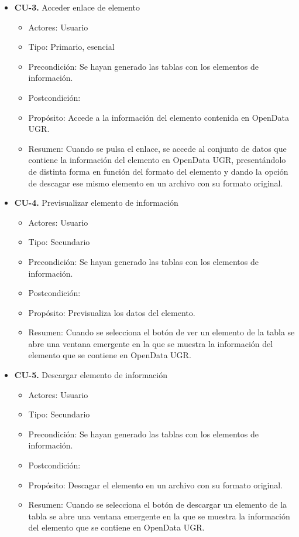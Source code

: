 \begin{itemize}
 \item \textbf{CU-3.} Acceder enlace de elemento
 \begin{itemize}
  \item Actores: Usuario
  \item Tipo: Primario, esencial
  \item Precondición: Se hayan generado las tablas con los elementos de información.
  \item Postcondición: 
  \item Propósito: Accede a la información del elemento contenida en OpenData UGR.
  \item Resumen: Cuando se pulsa el enlace, se accede al conjunto de datos que contiene la información del elemento en OpenData
  UGR, presentándolo de distinta forma en función del formato del elemento y dando la opción de descagar ese mismo elemento en 
  un archivo con su formato original.
 \end{itemize}
\end{itemize}

\begin{itemize}
 \item \textbf{CU-4.} Previsualizar elemento de información
 \begin{itemize}
  \item Actores: Usuario
  \item Tipo: Secundario
  \item Precondición: Se hayan generado las tablas con los elementos de información.
  \item Postcondición: 
  \item Propósito: Previsualiza los datos del elemento.
  \item Resumen: Cuando se selecciona el botón de ver un elemento de la tabla se abre una ventana emergente en la que se 
  muestra la información del elemento que se contiene en OpenData UGR.
 \end{itemize}
\end{itemize}

\newpage
\begin{itemize}
 \item \textbf{CU-5.} Descargar elemento de información
 \begin{itemize}
  \item Actores: Usuario
  \item Tipo: Secundario
  \item Precondición: Se hayan generado las tablas con los elementos de información.
  \item Postcondición: 
  \item Propósito: Descagar el elemento en un archivo con su formato original.
  \item Resumen: Cuando se selecciona el botón de descargar un elemento de la tabla se abre una ventana emergente en la que se
  muestra la información del elemento que se contiene en OpenData UGR.
 \end{itemize}
\end{itemize}

